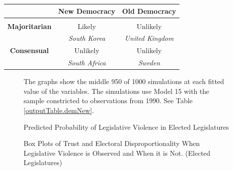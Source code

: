 \documentclass[a4paper]{article}\usepackage{graphicx, color}
\makeatletter
\newenvironment{kframe}{%
 \def\at@end@of@kframe{}%
 \ifinner\ifhmode%
  \def\at@end@of@kframe{\end{minipage}}%
  \begin{minipage}{\columnwidth}%
 \fi\fi%
 \def\FrameCommand##1{\hskip\@totalleftmargin \hskip-\fboxsep
 \colorbox{shadecolor}{##1}\hskip-\fboxsep
     \hskip-\linewidth \hskip-\@totalleftmargin \hskip\columnwidth}%
 \MakeFramed {\advance\hsize-\width
   \@totalleftmargin\z@ \linewidth\hsize
   \@setminipage}}%
 {\par\unskip\endMakeFramed%
 \at@end@of@kframe}
\newenvironment{knitrout}{}{} %
\makeatother
\begin{document}
{{\begin{table}[!h]
\begin{center}
\begin{tabular}{c | c c}
        & {\bf{New Democracy}} & {\bf{Old Democracy}} \\[0.25cm]
        \hline \\[0.25cm]
        {\bf{Majoritarian}} & Likely & Unlikely \\[0.25cm]
        & {\emph{South Korea}} & {\emph{United Kingdom}} \\[0.5cm]
        {\bf{Consensual}} & Unlikely & Unlikely \\[0.25cm]
         & {\emph{South Africa}} & {\emph{Sweden}} \\[0.25cm]
        \hline

    \end{tabular}
    \end{center}
\end{table}





\begin{figure}[t]
    \caption{Predicted Probability of Legislative Violence in Elected Legislatures}  
    \label{pred_prob}
    \begin{center}


\begin{knitrout}
\color{fgcolor}\begin{kframe}


{\ttfamily\noindent\bfseries\color{errorcolor}{\#\# Error: measure variables not found in data: NA}}\end{kframe}
\end{knitrout}

    \end{center}
    \begin{singlespace}
      {\scriptsize{The graphs show the middle 950 of 1000 simulations at each fitted value of the variables. The simulations use Model 15 with the sample constricted to observations from 1990. See Table \ref{outputTable.demNew}.}}
    \end{singlespace}
\end{figure}

\begin{figure}[t]
    \caption{Box Plots of Trust and Electoral Disproportionality When Legislative Violence is Observed and When it is Not. (Elected Legislatures)}  
    \label{BoxPlot}
    \begin{center}


\end{center}
\end{figure}}}
\end{document}
